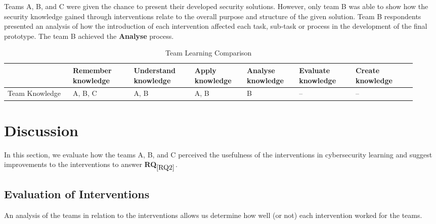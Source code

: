 \documentclass[runningheads]{llncs}
\newcommand{\hr}[1]{\textbf{RQ}$_{\ref{#1}}$}
\begin{document}
Teams A, B, and C were given the chance to present their developed security solutions. However, only team B was able to show how the security knowledge gained through interventions relate to the overall purpose and structure of the given solution. Team B respondents presented an analysis of how the introduction of each intervention affected each task, sub-task or process in the development of the final prototype. The team B achieved the \textbf{Analyse} process. 

\begin{table}[h]
    \caption{Team Learning Comparison}
    \label{tab:bloomteamcomp}
    \centering
    \begin{tabular}{|p{0.15\linewidth}|p{0.14\linewidth}|p{0.14\linewidth}|p{0.12\linewidth}|p{0.12\linewidth}|p{0.13\linewidth}|p{0.14\linewidth}|}
    \hline
	 & Remember knowledge & Understand knowledge & Apply knowledge & Analyse knowledge & Evaluate knowledge & Create knowledge\\ \hline
	Team \newline Knowledge & A, B, C & A, B & A, B & B & -- & -- \\ \hline
    \end{tabular}
\end{table}


\section{Discussion}
In this section, we evaluate how the teams A, B, and C perceived the usefulness of the interventions in cybersecurity learning and suggest improvements to the interventions to answer \hr{RQ2}.


\subsection{Evaluation of Interventions} \label{evalintervention}
An analysis of the teams in relation to the interventions allows us determine how well (or not) each intervention worked for the teams.
\end{document}

